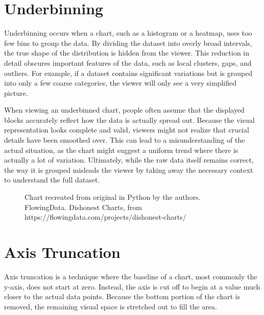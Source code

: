 \newpage
\section{Underbinning}
Underbinning occurs when a chart, such as a histogram or a heatmap, uses too few bins to group the data. By dividing the dataset into overly broad intervals, the true shape of the distribution is hidden from the viewer. This reduction in detail obscures important features of the data, such as local clusters, gaps, and outliers. For example, if a dataset contains significant variations but is grouped into only a few coarse categories, the viewer will only see a very simplified picture.

When viewing an underbinned chart, people often assume that the displayed blocks accurately reflect how the data is actually spread out. Because the visual representation looks complete and valid, viewers might not realize that crucial details have been smoothed over. This can lead to a misunderstanding of the actual situation, as the chart might suggest a uniform trend where there is actually a lot of variation. Ultimately, while the raw data itself remains correct, the way it is grouped misleads the viewer by taking away the necessary context to understand the full dataset.

\begin{figure}[htbp]
    \centering
    \begin{minipage}{0.48\textwidth}
        \centering
        
    \end{minipage}\hfill
    \begin{minipage}{0.48\textwidth}
        \centering
        
    \end{minipage}
    \caption[Comparison showing proper binning (left) versus underbinning (right).]{Chart recreated from original in Python by the authors. \\ FlowingData. Dishonest Charts, from https://flowingdata.com/projects/dishonest-charts/}
    \label{fig:binning_comparison}
\end{figure}

\newpage
\section{Axis Truncation}
Axis truncation is a technique where the baseline of a chart, most commonly the y-axis, does not start at zero. Instead, the axis is cut off to begin at a value much closer to the actual data points. Because the bottom portion of the chart is removed, the remaining visual space is stretched out to fill the area. 

